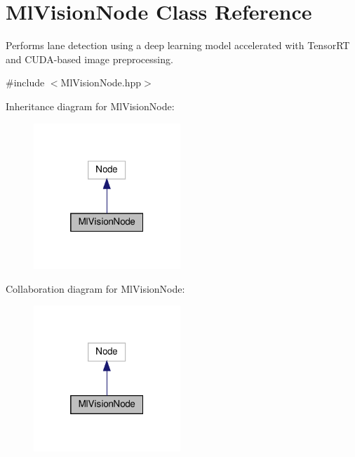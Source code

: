 \hypertarget{classMlVisionNode}{}\section{Ml\+Vision\+Node Class Reference}
\label{classMlVisionNode}


Performs lane detection using a deep learning model accelerated with Tensor\+RT and C\+U\+D\+A-\/based image preprocessing.  




{\ttfamily \#include $<$Ml\+Vision\+Node.\+hpp$>$}



Inheritance diagram for Ml\+Vision\+Node\+:
\nopagebreak
\begin{figure}[H]
\begin{center}
\leavevmode
\includegraphics[width=157pt]{classMlVisionNode__inherit__graph}
\end{center}
\end{figure}


Collaboration diagram for Ml\+Vision\+Node\+:
\nopagebreak
\begin{figure}[H]
\begin{center}
\leavevmode
\includegraphics[width=157pt]{classMlVisionNode__coll__graph}
\end{center}
\end{figure}
